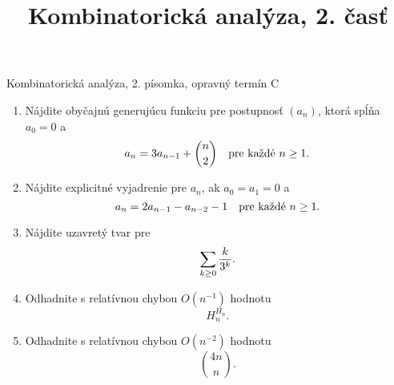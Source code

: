 \documentclass[a4paper, 12pt]{article}
\title{Kombinatorická analýza, 2. časť}
\date{}
\begin{document}
\centerline{Kombinatorická analýza, 2. písomka, opravný termín C}

\begin{enumerate}
\item
Nájdite obyčajnú generujúcu funkciu pre postupnosť $(a_n)$, ktorá spĺňa $a_0=0$ a
$$
a_n = 3a_{n-1} + {n\choose 2}\quad\hbox{pre každé $n\ge 1$}.
$$

\item
Nájdite explicitné vyjadrenie pre $a_n$, ak $a_0=a_1=0$ a
$$
a_n = 2a_{n-1}-a_{n-2}-1\quad\hbox{pre každé $n\ge 1$}.
$$

\item
Nájdite uzavretý tvar pre
$$
\sum_{k\ge 0} {k\over 3^k}.
$$

\item
Odhadnite s relatívnou chybou $O(n^{-1})$ hodnotu
$$
H_n^{H_n}.
$$

\item
Odhadnite s relatívnou chybou $O(n^{-2})$ hodnotu
$$
{4n\choose n}.
$$


\end{enumerate}
\end{document}
